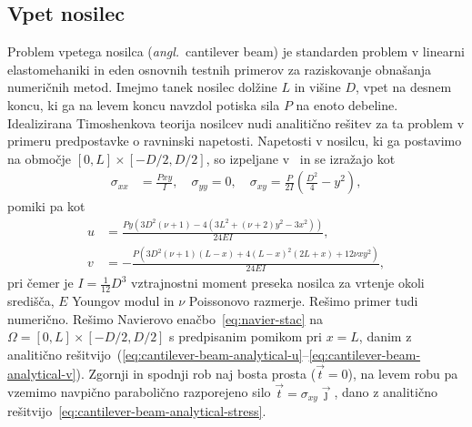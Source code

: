 \documentclass[12pt,a4paper,twoside]{article}
\theoremstyle{definition} %
\theoremstyle{plain} %
\numberwithin{equation}{section}
\newcommand{\vt}{\vec{t}}
\newcommand{\vj}{\vec{\jmath}}
\newcommand{\ts}{\sigma}
\newcommand{\ang}[1]{(\hspace{-1.5px}\textit{angl.}\ #1)}
\begin{document}
\subsection{Vpet nosilec}
Problem vpetega nosilca \ang{cantilever beam} je standarden problem v linearni elastomehaniki in eden
osnovnih testnih primerov za raziskovanje obnašanja numeričnih metod. Imejmo tanek nosilec dolžine
$L$ in višine $D$, vpet na desnem koncu, ki ga na levem koncu navzdol potiska sila $P$ na enoto
debeline. Idealizirana Timoshenkova teorija nosilcev nudi analitično rešitev za ta problem v primeru
predpostavke o ravninski napetosti. Napetosti v nosilcu, ki ga postavimo na območje $[0, L]
\times [-D/2, D/2]$, so izpeljane v~\cite[str.\ 284--289, enačba 7.4.55]{slaughter2012linearized} in
se izražajo kot
\begin{align}
  \ts_{xx} &= \frac{Pxy}{I}, \quad \ts_{yy} = 0, \quad \ts_{xy} = \frac{P}{2I} \left( \frac{D^2}{4}
  - y^2 \right),
  \label{eq:cantilever-beam-analytical-stress}
\end{align}
pomiki pa kot
\begin{align}
  u &= \frac{P y \left(3 D^2 (\nu +1)-4 \left(3 L^2+(\nu +2) y^2-3 x^2\right)\right)}{24 E I},
  \label{eq:cantilever-beam-analytical-u} \\
  v &= -\frac{P \left(3 D^2 (\nu +1) (L-x)+4 (L-x)^2 (2 L+x)+12 \nu  x y^2\right)}{24 E I}, \label{eq:cantilever-beam-analytical-v}
\end{align}
pri čemer je $I = \frac{1}{12} D^3$ vztrajnostni moment preseka nosilca za vrtenje okoli središča,
$E$ Youngov modul in $\nu$ Poissonovo razmerje. Rešimo primer tudi numerično. Rešimo Navierovo
enačbo~\eqref{eq:navier-stac} na $\Omega = [0, L] \times [-D/2, D/2]$ s predpisanim pomikom pri $x =
L$, danim z analitično
rešitvijo~(\ref{eq:cantilever-beam-analytical-u}--\ref{eq:cantilever-beam-analytical-v}). Zgornji
in spodnji rob naj bosta prosta ($\vt = 0$), na levem robu pa vzemimo navpično parabolično
razporejeno silo $\vt = \ts_{xy}\vj$, dano z analitično
rešitvijo~\eqref{eq:cantilever-beam-analytical-stress}.
\end{document}
